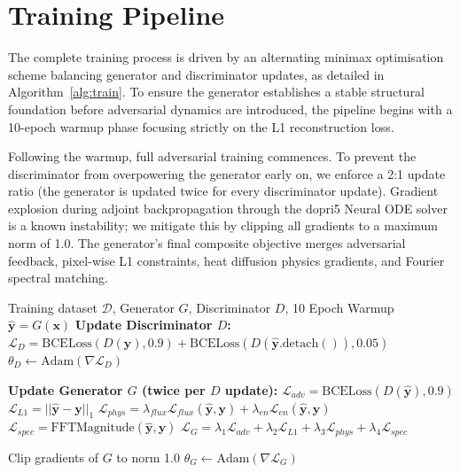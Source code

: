 \section{Training Pipeline}

The complete training process is driven by an alternating minimax optimisation scheme balancing generator and discriminator updates, as detailed in Algorithm~\ref{alg:train}. To ensure the generator establishes a stable structural foundation before adversarial dynamics are introduced, the pipeline begins with a 10-epoch warmup phase focusing strictly on the L1 reconstruction loss. 

Following the warmup, full adversarial training commences. To prevent the discriminator from overpowering the generator early on, we enforce a 2:1 update ratio (the generator is updated twice for every discriminator update). Gradient explosion during adjoint backpropagation through the dopri5 Neural ODE solver is a known instability; we mitigate this by clipping all gradients to a maximum norm of 1.0. The generator's final composite objective merges adversarial feedback, pixel-wise L1 constraints, heat diffusion physics gradients, and Fourier spectral matching.

\begin{algorithm}[H]
\caption{PC-LiquidGAN Adversarial Training Loop}
\label{alg:train}
\begin{algorithmic}[1]
\Require Training dataset $\mathcal{D}$, Generator $G$, Discriminator $D$, 10 Epoch Warmup
        \State $\hat{\mathbf{y}} = G(\mathbf{x})$ 
            \State \textbf{Update Discriminator $D$:}
            \State $\mathcal{L}_D = \text{BCELoss}(D(\mathbf{y}), 0.9) + \text{BCELoss}(D(\hat{\mathbf{y}}.\text{detach}()), 0.05)$
            \State $\theta_D \leftarrow \text{Adam}(\nabla \mathcal{L}_D)$
        \EndIf
        
        \State \textbf{Update Generator $G$ (twice per $D$ update):}
        \State $\mathcal{L}_{adv} = \text{BCELoss}(D(\hat{\mathbf{y}}), 0.9)$ 
        \State $\mathcal{L}_{L1} = ||\hat{\mathbf{y}} - \mathbf{y}||_1$
        \State $\mathcal{L}_{phys} = \lambda_{flux}\mathcal{L}_{flux}(\hat{\mathbf{y}}, \mathbf{y}) + \lambda_{en}\mathcal{L}_{en}(\hat{\mathbf{y}}, \mathbf{y})$
        \State $\mathcal{L}_{spec} = \text{FFTMagnitude}(\hat{\mathbf{y}}, \mathbf{y})$
        \State $\mathcal{L}_G = \lambda_1\mathcal{L}_{adv} + \lambda_2\mathcal{L}_{L1} + \lambda_3\mathcal{L}_{phys} + \lambda_4\mathcal{L}_{spec}$
        
        \State Clip gradients of $G$ to norm 1.0
        \State $\theta_G \leftarrow \text{Adam}(\nabla \mathcal{L}_G)$
    \EndFor
\EndFor
\end{algorithmic}
\end{algorithm}

